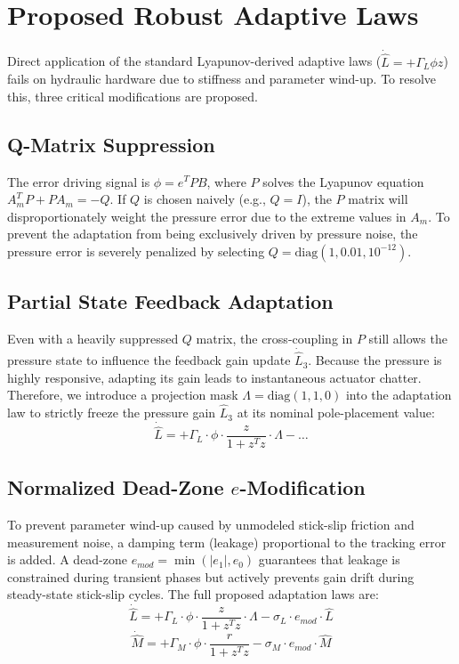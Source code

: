 \documentclass[12pt,a4paper]{article}
\begin{document}
\section{Proposed Robust Adaptive Laws}
Direct application of the standard Lyapunov-derived adaptive laws ($\dot{\hat{L}} = +\Gamma_L \phi z$) fails on hydraulic hardware due to stiffness and parameter wind-up. To resolve this, three critical modifications are proposed.

\subsection{Q-Matrix Suppression}
The error driving signal is $\phi = e^T P B$, where $P$ solves the Lyapunov equation $A_m^T P + P A_m = -Q$. If $Q$ is chosen naively (e.g., $Q=I$), the $P$ matrix will disproportionately weight the pressure error due to the extreme values in $A_m$. To prevent the adaptation from being exclusively driven by pressure noise, the pressure error is severely penalized by selecting $Q = \text{diag}(1, 0.01, 10^{-12})$.

\subsection{Partial State Feedback Adaptation}
Even with a heavily suppressed $Q$ matrix, the cross-coupling in $P$ still allows the pressure state to influence the feedback gain update $\dot{\hat{L}}_3$. Because the pressure is highly responsive, adapting its gain leads to instantaneous actuator chatter. Therefore, we introduce a projection mask $\Lambda = \text{diag}(1, 1, 0)$ into the adaptation law to strictly freeze the pressure gain $\hat{L}_3$ at its nominal pole-placement value:
\begin{equation}
    \dot{\hat{L}} = +\Gamma_L \cdot \phi \cdot \frac{z}{1 + z^T z} \cdot \Lambda - \dots
\end{equation}

\subsection{Normalized Dead-Zone $e$-Modification}
To prevent parameter wind-up caused by unmodeled stick-slip friction and measurement noise, a damping term (leakage) proportional to the tracking error is added. A dead-zone $e_{mod} = \min(|e_1|, e_0)$ guarantees that leakage is constrained during transient phases but actively prevents gain drift during steady-state stick-slip cycles. The full proposed adaptation laws are:
\begin{equation}
    \dot{\hat{L}} = +\Gamma_L \cdot \phi \cdot \frac{z}{1 + z^T z} \cdot \Lambda - \sigma_L \cdot e_{mod} \cdot \hat{L}
\end{equation}
\begin{equation}
    \dot{\hat{M}} = +\Gamma_M \cdot \phi \cdot \frac{r}{1 + z^T z} - \sigma_M \cdot e_{mod} \cdot \hat{M}
\end{equation}
\end{document}
